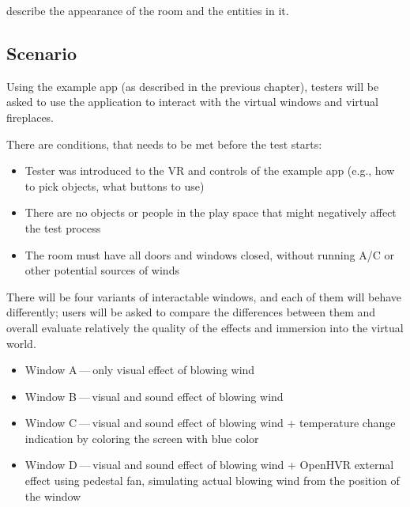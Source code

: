\hyperlink{09-example-app}{} describe the appearance of the room and the entities in it.


\hypertarget{x-scenario}{\subsection{Scenario}}
Using the example app (as described in the previous chapter), testers will
be asked to use the application to interact with the virtual windows and
virtual fireplaces.


There are conditions, that needs to be met before the test starts:


\begin{itemize}

\item Tester was introduced to the VR and controls of
the example app (e.g., how to pick objects, what buttons to use)

\item There are no objects or people in the play space that might negatively affect
the test process

\item The room must have all doors and windows closed, without running A/C
or other potential sources of winds

\end{itemize}


There will be four variants of interactable windows, and each of them will
behave differently; users will be asked to compare the differences between
them and overall evaluate relatively the quality of the effects and
immersion into the virtual world.


\begin{itemize}

\item Window A — only visual effect of blowing wind

\item Window B — visual and sound effect of blowing wind

\item Window C — visual and sound effect of blowing wind + temperature change
indication by coloring the screen with blue color

\item Window D — visual and sound effect of blowing wind + OpenHVR external effect
using pedestal fan, simulating actual blowing wind from the position of
the window

\end{itemize}



